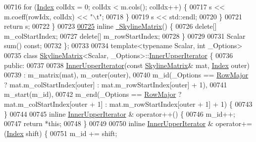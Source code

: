 \begin{DoxyCode}
00716             \textcolor{keywordflow}{for} (\hyperlink{group___core___module_a554f30542cc2316add4b1ea0a492ff02}{Index} colIdx = 0; colIdx < m.cols(); colIdx++) \{
00717                 s << m.coeff(rowIdx, colIdx) << \textcolor{stringliteral}{"\(\backslash\)t"};
00718             \}
00719             s << std::endl;
00720         \}
00721         \textcolor{keywordflow}{return} s;
00722     \}
00723 
\hyperlink{class_eigen_1_1_skyline_matrix_a456b254a757d26580b2c05fe270eaae7}{00725}     \textcolor{keyword}{inline} \hyperlink{class_eigen_1_1_skyline_matrix_a456b254a757d26580b2c05fe270eaae7}{~SkylineMatrix}() \{
00726         \textcolor{keyword}{delete}[] m\_colStartIndex;
00727         \textcolor{keyword}{delete}[] m\_rowStartIndex;
00728     \}
00729 
00731     Scalar sum() \textcolor{keyword}{const};
00732 \};
00733 
00734 \textcolor{keyword}{template}<\textcolor{keyword}{typename} Scalar, \textcolor{keywordtype}{int} \_Options>
00735 \textcolor{keyword}{class }\hyperlink{class_eigen_1_1_skyline_matrix}{SkylineMatrix}<Scalar, \_Options>::\hyperlink{class_eigen_1_1_skyline_matrix_1_1_inner_upper_iterator}{InnerUpperIterator} \{
00736 \textcolor{keyword}{public}:
00737 
00738     \hyperlink{class_eigen_1_1_skyline_matrix_1_1_inner_upper_iterator}{InnerUpperIterator}(\textcolor{keyword}{const} \hyperlink{class_eigen_1_1_skyline_matrix}{SkylineMatrix}& mat, 
      \hyperlink{group___core___module_a554f30542cc2316add4b1ea0a492ff02}{Index} outer)
00739     : m\_matrix(mat), m\_outer(outer),
00740     m\_id(\_Options == \hyperlink{group__enums_ggaacded1a18ae58b0f554751f6cdf9eb13acfcde9cd8677c5f7caf6bd603666aae3}{RowMajor} ? mat.m\_colStartIndex[outer] : mat.m\_rowStartIndex[outer] + 1),
00741     m\_start(m\_id),
00742     m\_end(\_Options == \hyperlink{group__enums_ggaacded1a18ae58b0f554751f6cdf9eb13acfcde9cd8677c5f7caf6bd603666aae3}{RowMajor} ? mat.m\_colStartIndex[outer + 1] : mat.m\_rowStartIndex[outer + 1] + 
      1) \{
00743     \}
00744 
00745     \textcolor{keyword}{inline} \hyperlink{class_eigen_1_1_skyline_matrix_1_1_inner_upper_iterator}{InnerUpperIterator} & operator++() \{
00746         m\_id++;
00747         \textcolor{keywordflow}{return} *\textcolor{keyword}{this};
00748     \}
00749 
00750     \textcolor{keyword}{inline} \hyperlink{class_eigen_1_1_skyline_matrix_1_1_inner_upper_iterator}{InnerUpperIterator} & operator+=(\hyperlink{group___core___module_a554f30542cc2316add4b1ea0a492ff02}{Index} shift) \{
00751         m\_id += shift;

\end{DoxyCode}
